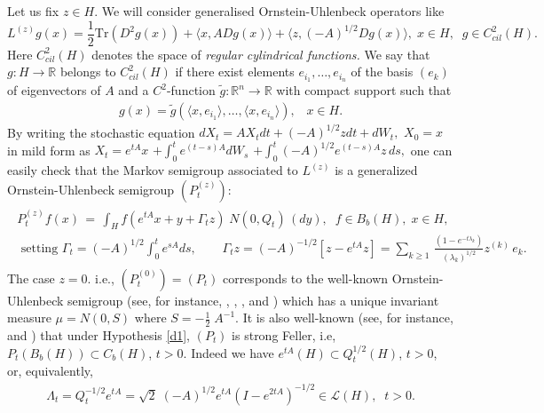 \documentclass[preprint]{imsart}
\def\R{\mathbb R}
\def\ds{\displaystyle}
\begin{document}
Let us fix $z \in H$.  We will consider  generalised Ornstein-Uhlenbeck operators like  
\begin{equation} \label{ou3}
L^{(z)} g(x) = \frac{1}{2} \mbox{Tr}(D^2 g(x)) +
 \langle x , A Dg (x)\rangle +  \langle z , (-A)^{1/2} Dg (x)\rangle , \; x \in H, \;\; g \in C^2_{cil}(H).
\end{equation}
Here $C^2_{cil}(H)$ denotes the space of {\sl regular 
cylindrical functions.} We say that  $g: H \to \R$ 
   belongs to $C^2_{cil}(H)$ if there exist elements $e_{i_1}, \ldots, e_{i_n}$ of the basis $(e_k)$ of eigenvectors of $A$ and a $C^2$-function  $\tilde g : \R^n \to \R$ with compact support such that 
\begin{gather} \label{cil2}
 g(x) = \tilde g (\langle  x, e_{i_1}\rangle, \ldots, \langle  x, e_{i_n} \rangle),\;\;\; x \in H.
\end{gather}  
By writing the stochastic equation $dX_t = AX_t dt +  (-A)^{1/2} z dt + dW_t,$ $ X_0 =x$ in mild form as  
$
X_t = e^{tA} x $ $+ \int_0^t e^{(t-s)A} dW_s $ $ +  \int_0^t (-A)^{1/2}e^{(t-s)A} z\,  ds, 
$
 one can easily check that the Markov semigroup associated to 
 $L^{(z)}$ is a  generalized Ornstein-Uhlenbeck semigroup $(P_t^{(z)})$:
\begin{gather}\label{gt}
 \begin{array}{l}  \ds 
P_t^{(z)} f (x) \, 
 =\, \int_{H} f(e^{tA} x+ y + \Gamma_t z  )  \; {    N  (0 , Q_t)} \, (dy),\;\; 
f \in { B}_b (H),\; x \in H,
\\   
 \text{ setting $\Gamma_t = (-A)^{1/2} \int_0^t e^{sA} ds, $  } 
 \;\;\;\;\; 
 \Gamma_t z = (-A)^{-1/2}[z- e^{tA}z] 
   = \sum_{k \ge 1} \, \frac {(1- e^{-t \lambda_k })}{(\lambda_k)^{1/2}} z^{(k)} \,  e_k. 
 \end{array} 
\end{gather} 
The  case $z=0$. i.e., $(P_t^{(0)})= (P_t)$ corresponds to the well-known Ornstein-Uhlenbeck semigroup (see, for instance, \cite{DZ1}, \cite{DZ}, \cite{D2}, \cite{DFPR} and \cite{DFRV}) which has  a unique invariant measure $\mu =N(0,S)$
where $S=-\frac12\;A^{-1}$. 
  It is also well-known (see, for instance, \cite{DZ1} and  \cite{DZ}) that under Hypothesis \ref{d1}, $(P_t)$ is strong Feller, i.e, $P_t (B_b(H)) \subset C_b(H)$, $t>0$.  
  Indeed we have $e^{tA}(H) \subset Q^{1/2}_t(H)$, $t>0$, or, equivalently,
\begin{equation}
\label{lam}  
\begin{array} {l} 
 \Lambda_t=Q_t^{-1/2}e^{tA}=\sqrt 2\;
(-A)^{1/2}e^{tA}(I-e^{2tA})^{-1/2} \in {\mathcal L}(H),\;\; t>0.
\end{array} 
\end{equation} 
\end{document}
